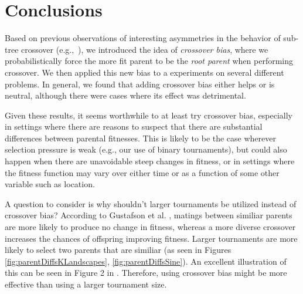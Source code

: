 \documentclass{sig-alternate}
\begin{document}

\section{Conclusions} \label{sec:Conclusions}

Based on previous observations of interesting asymmetries in the behavior of sub-tree crossover
(e.g.,~\cite{McPheeDonatucciDramdahl:2014}), we introduced the idea of \emph{crossover bias}, where we
probabilistically force the more fit parent to be the \emph{root parent} when performing crossover. We then applied
this new bias to a experiments on several different problems. In general, we found that adding crossover bias either
helps or is neutral, although there were cases where its effect was detrimental.

Given these results, it seems worthwhile to at least try crossover bias, especially in settings where there are reasons
to suspect that there are substantial differences between parental fitnesses. This is likely to be the case wherever
selection pressure is weak (e.g., our use of binary tournaments), but could also happen when there are unavoidable
steep changes in fitness, or in settings where the fitness function may vary over either time or as a function of some
other variable such as location.

A question to consider is why shouldn't larger tournaments be utilized instead of crossover bias? According to Gustafson et al. \cite{Gustafson:2005}, matings between similiar parents are more likely to produce no change in fitness, whereas a more diverse crossover increases the chances of offspring improving fitness. Larger tournaments are more likely to select two parents that are similiar (as seen in Figures \ref{fig:parentDiffsKLandscapes}, \ref{fig:parentDiffsSine}). An excellent illustration of this can be seen in Figure 2 in \cite{Boetticher:2006}. Therefore, using crossover bias might be more effective than using a larger tournament size. 
\end{document}
